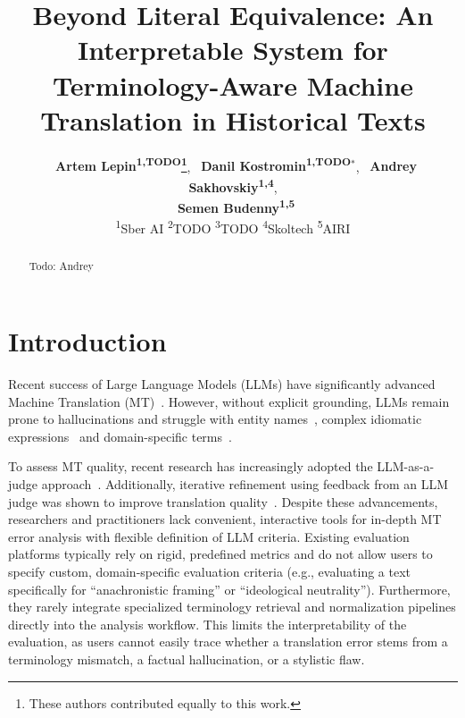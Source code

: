 \documentclass[11pt]{article}
\title{Beyond Literal Equivalence: An Interpretable System for Terminology-Aware Machine Translation in Historical Texts}
\author{ 
    ~\textbf{Artem Lepin\textsuperscript{1,TODO}\thanks{These authors contributed equally to this work.}},
    ~\textbf{Danil Kostromin\textsuperscript{1,TODO}$^*$},
    ~\textbf{Andrey Sakhovskiy\textsuperscript{1,4}},\\
    ~\textbf{Semen Budenny\textsuperscript{1,5}}
    \\
    \textsuperscript{1}Sber AI
    \textsuperscript{2}TODO
    \textsuperscript{3}TODO
    \textsuperscript{4}Skoltech
    \textsuperscript{5}AIRI
    \\ 
}
\begin{document}
\maketitle
\begin{abstract}
Todo: Andrey
\end{abstract}

\section{Introduction}

Recent success of Large Language Models (LLMs) have significantly advanced Machine Translation (MT)~\cite{kocmi-etal-2024-findings,semenov-etal-2025-findings,feng-etal-2025-tear,DBLP:conf/iclr/WangZLWMZZ25,tan-etal-2026-llm}. However, without explicit grounding, LLMs remain prone to hallucinations and struggle with entity names~\cite{conia-etal-2024-towards}, complex idiomatic expressions~\cite{liu-etal-2023-crossing,kim-etal-2025-memorization,liu-etal-2026-evaluating} and domain-specific terms~\cite{oncevay-etal-2025-translating}.


To assess MT quality, recent research has increasingly adopted the LLM-as-a-judge approach~\cite{kocmi-federmann-2023-large,kim-2025-rubric,bavaresco-etal-2025-llms,feng-etal-2025-mad,DBLP:journals/corr/abs-2510-20780}. Additionally, iterative refinement using feedback from an LLM judge was shown to improve translation quality~\cite{raunak-etal-2023-leveraging,wang-etal-2024-taste,feng-etal-2025-tear}.
Despite these advancements, researchers and practitioners lack convenient, interactive tools for in-depth MT error analysis with flexible definition of LLM criteria. Existing evaluation platforms typically rely on rigid, predefined metrics and do not allow users to specify custom, domain-specific evaluation criteria (e.g., evaluating a text specifically for ``anachronistic framing'' or ``ideological neutrality''). Furthermore, they rarely integrate specialized terminology retrieval and normalization pipelines directly into the analysis workflow. This limits the interpretability of the evaluation, as users cannot easily trace whether a translation error stems from a terminology mismatch, a factual hallucination, or a stylistic flaw.
\end{document}
